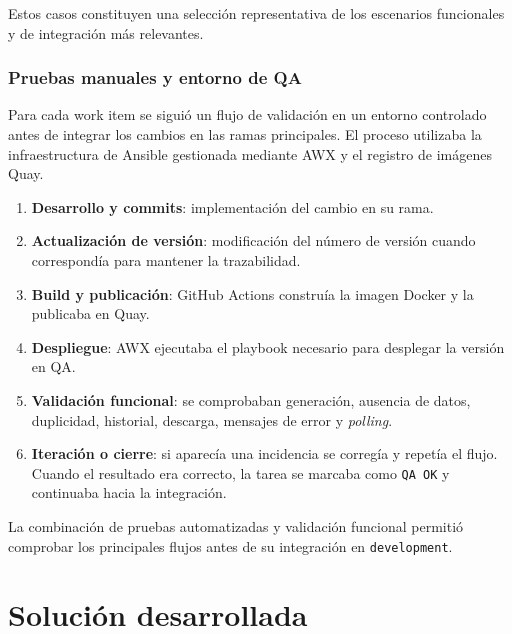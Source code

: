 \documentclass[11pt,a4paper,titlepage,oneside]{report}
\begin{document}
Estos casos constituyen una selección representativa de los escenarios
funcionales y de integración más relevantes.

\subsection{Pruebas manuales y entorno de QA}

Para cada work item se siguió un flujo de validación en un entorno controlado
antes de integrar los cambios en las ramas principales. El proceso utilizaba
la infraestructura de Ansible gestionada mediante AWX y el registro de
imágenes Quay.

\begin{enumerate}

  \item \textbf{Desarrollo y commits}: implementación del cambio en su rama.

  \item \textbf{Actualización de versión}: modificación del número de versión
  cuando correspondía para mantener la trazabilidad.

  \item \textbf{Build y publicación}: GitHub Actions construía la imagen Docker
  y la publicaba en Quay.

  \item \textbf{Despliegue}: AWX ejecutaba el playbook necesario para desplegar
  la versión en QA.

  \item \textbf{Validación funcional}: se comprobaban generación, ausencia de
  datos, duplicidad, historial, descarga, mensajes de error y
  \textit{polling}.

  \item \textbf{Iteración o cierre}: si aparecía una incidencia se corregía y
  repetía el flujo. Cuando el resultado era correcto, la tarea se marcaba como
  \texttt{QA OK} y continuaba hacia la integración.

\end{enumerate}

La combinación de pruebas automatizadas y validación funcional permitió
comprobar los principales flujos antes de su integración en
\texttt{development}.


\chapter{Solución desarrollada}
\label{chap:solucion}
\end{document}

